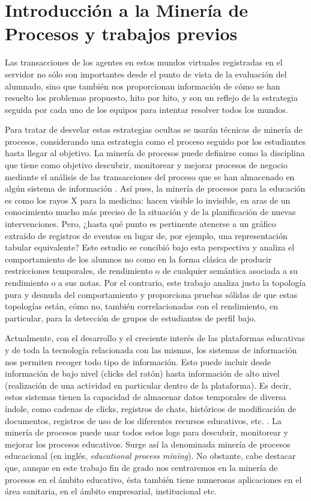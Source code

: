 \chapter{Introducción a la Minería de Procesos y trabajos previos}\label{sec:chapterII}

Las transacciones de los agentes en estos mundos virtuales registradas en el servidor no sólo son importantes desde el punto de vista de la evaluación del alumnado, sino que también nos proporcionan información de cómo se han resuelto los problemas propuesto, hito por hito, y son un reflejo de la estrategia seguida por cada uno de los equipos para intentar resolver todos los mundos.

Para tratar de desvelar estas estrategias ocultas se usarán técnicas de minería de procesos, considerando una estrategia como el proceso seguido por los estudiantes hasta llegar al objetivo. La minería de procesos puede definirse como la disciplina que tiene como objetivo descubrir, monitorear y mejorar procesos de negocio mediante el análisis de las transacciones del proceso que se han almacenado en algún sistema de información \citep{Mayorga_2015}. Así pues, la minería de procesos para la educación es como los rayos X para la medicina: hacen visible lo invisible, en aras de un conocimiento mucho más preciso de la situación y de la planificación de nuevas intervenciones. Pero, ¿hasta qué punto es pertinente atenerse a un gráfico extraído de registros de eventos en lugar de, por ejemplo, una representación tabular equivalente? Este estudio se concibió bajo esta perspectiva y analiza el comportamiento de los alumnos no como en la forma clásica de producir restricciones temporales, de rendimiento o de cualquier semántica asociada a su rendimiento o a sus notas. Por el contrario, este trabajo analiza justo la topología pura y desnuda del comportamiento y proporciona pruebas sólidas de que estas topologías están, cómo no, también correlacionadas con el rendimiento, en particular, para la detección de grupos de estudiantes de perfil bajo.

Actualmente, con el desarrollo y el creciente interés de las plataformas educativas y de toda la tecnología relacionada con las mismas, los sistemas de información nos permiten recoger todo tipo de información. Esto puede incluir desde información de bajo nivel (clicks del ratón) hasta información de alto nivel (realización de una actividad en particular dentro de la plataforma). Es decir, estos sistemas tienen la capacidad de almacenar datos temporales de diversa índole, como cadenas de clicks, registros de chats, históricos de modificación de documentos, registros de uso de los diferentes recursos educativos, etc. \cite{bogarin2018survey}. La minería de procesos puede usar todos estos logs para descubrir, monitorear y mejorar los procesos educativos. Surge así la denominada minería de procesos educacional (en inglés, \emph{educational process mining}). No obstante, cabe destacar que, aunque en este trabajo fin de grado nos centraremos en la minería de procesos en el ámbito educativo, ésta también tiene numerosas aplicaciones en el área sanitaria, en el ámbito empresarial, institucional etc.

